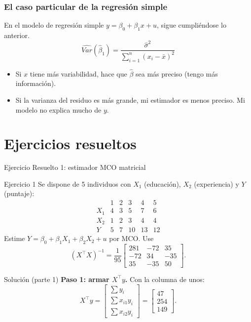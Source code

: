 \documentclass{beamer}
\begin{document}
\begin{frame}
\frametitle{El caso particular de la regresión simple}
En el modelo de regresión simple $y = \beta_0 + \beta_1 x + u$, sigue cumpliéndose lo anterior.
\[
\hat{Var}(\hat{\beta}_1) = {\frac{{\hat{\sigma}}^2}{\sum_{i=1}^{n}(x_i - \bar{x})^2}}
\]
\begin{itemize}
    \item Si $x$ tiene más variabilidad, hace que $\hat{\beta}$ sea más preciso (tengo más información).
    \item Si la varianza del residuo es más grande, mi estimador es menos preciso. Mi modelo no explica mucho de $y$.
\end{itemize}
 \end{frame}

\section{Ejercicios resueltos}

\begin{frame}{Ejercicio Resuelto 1: estimador MCO matricial}

\begin{block}{Ejercicio 1}
Se dispone de 5 individuos con $X_1$ (educación), $X_2$ (experiencia) y $Y$ (puntaje):
\[
\begin{array}{c|ccccc}
 & 1 & 2 & 3 & 4 & 5\\\hline
X_1 & 4 & 3 & 5 & 7 & 6\\
X_2 & 1 & 2 & 3 & 4 & 4\\
Y   & 5 & 7 & 10 & 13 & 12
\end{array}
\]
Estime $Y=\beta_0+\beta_1 X_1+\beta_2 X_2+u$ por MCO. Use
\[
(X^{\top}X)^{-1}=\frac{1}{95}\begin{bmatrix}281 & -72 & 35\\ -72 & 34 & -35\\ 35 & -35 & 50\end{bmatrix}.
\]
\end{block}

\pause

\begin{exampleblock}{Solución (parte 1)}
\textbf{Paso 1: armar $X^{\top}y$.} Con la columna de unos:
\[
X^{\top}y = \begin{bmatrix} \sum y_i\\ \sum x_{i1}y_i\\ \sum x_{i2}y_i \end{bmatrix}
= \begin{bmatrix} 47 \\ 254 \\ 149 \end{bmatrix}.
\]
\end{exampleblock}

\end{frame}
\end{document}
